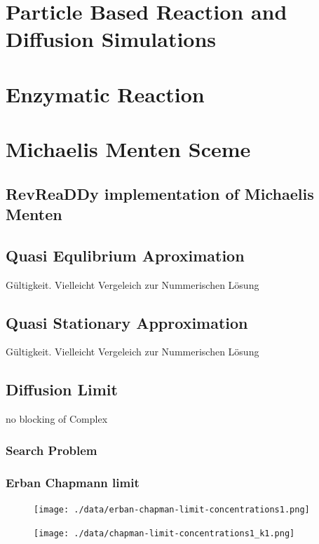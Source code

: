 \documentclass[
  a4paper,BCOR10mm,oneside,
  bibtotoc,idxtotoc,
  headsepline,footsepline,%
  fleqn,openbib
]{scrbook}
\begin{document}
\section{Particle Based Reaction and Diffusion Simulations}
\section{Enzymatic Reaction}
\section{Michaelis Menten Sceme}
\subsection{RevReaDDy implementation of Michaelis Menten}
\subsection{Quasi Equlibrium Aproximation}
Gültigkeit. Vielleicht Vergeleich zur Nummerischen Lösung 
\subsection{Quasi Stationary Approximation }
Gültigkeit. Vielleicht Vergeleich zur Nummerischen Lösung 
\subsection{Diffusion Limit}
no blocking of Complex
\subsubsection{Search Problem}


\subsubsection{Erban Chapmann limit}
\begin{figure}[h!]
  \centering
  \texttt{[image: ./data/erban-chapman-limit-concentrations1.png]}
  \captionsetup{width=\linewidth}
  \label{fig:diffusion_limit-Erban-Chapmann}
\end{figure}
\begin{figure}[h!]
  \centering
  \texttt{[image: ./data/chapman-limit-concentrations1\_k1.png]}
  \captionsetup{width=\linewidth}
  \label{fig:diffusion_limit-Erban-Chapmann_k1}
\end{figure}
\end{document}

